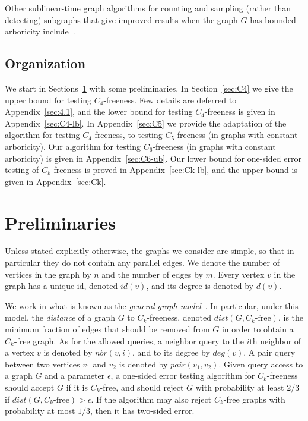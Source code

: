 \documentclass{article}
\newcommand{\eps}{\epsilon}
\newcommand{\commentt}[1]{ {}}
\newcommand{\reut}[1]{ {}}
\begin{document}
Other sublinear-time graph algorithms 
for counting and sampling (rather than detecting) subgraphs 
that give improved results when the graph $G$ has bounded arboricity include~\cite{ERS19,ERR19,ERS20, ERR22}. 

\subsection{Organization}
We start in Sections~\ref{sec:prel} with some preliminaries. In 
Section~\ref{sec:C4} we give the upper bound for testing $C_4$-freeness. Few details are deferred to Appendix~\ref{sec:4.1}, and the lower bound for testing $C_4$-freeness is given in 
Appendix~\ref{sec:C4-lb}.
In Appendix~\ref{sec:C5} we provide the adaptation of the algorithm for testing $C_4$-freeness, to testing $C_5$-freeness (in graphs with constant arboricity). 
Our algorithm for testing $C_6$-freeness (in graphs with constant arboricity) is given in Appendix~\ref{sec:C6-ub}. Our lower bound for one-sided error testing of $C_k$-freeness is proved in Appendix~\ref{sec:Ck-lb}, and the upper bound is given in Appendix~\ref{sec:Ck}.




\section{Preliminaries}\label{sec:prel}

Unless stated explicitly otherwise, the graphs we consider are simple, so that in particular they do not contain any parallel edges. We denote the number of vertices in the graph by $n$ and the number of edges by $m$. Every vertex $v$ in the graph has a unique id, denoted $id(v)$, and its degree is denoted by $d(v)$.

We work in what is known as the \emph{general graph model}~\cite{ParnasR02,KKR04}. In particular, under this model,
the \emph{distance} of a graph $G$ to $C_k$-freeness, denoted $dist(G,C_k\text{-free})$, is the minimum fraction of edges that should be  removed from $G$ in order to obtain a $C_k$-free graph.
As for the allowed queries, 
a neighbor query to the $i$th neighbor of a vertex $v$ is denoted by $nbr(v,i)$, and to its degree by $deg(v)$. A pair query between two vertices $v_1$ and $v_2$ is denoted by $pair(v_1,v_2)$.
Given query access to a graph $G$ and a parameter $\eps$, a one-sided error testing algorithm for $C_k$-freeness should accept $G$ if it is $C_k$-free, and should reject $G$ with probability at least $2/3$ if $dist(G,C_k\text{-free}) > \eps$.
If the algorithm may also reject $C_k$-free graphs with probability at most $1/3$, then it has two-sided error.
\end{document}
